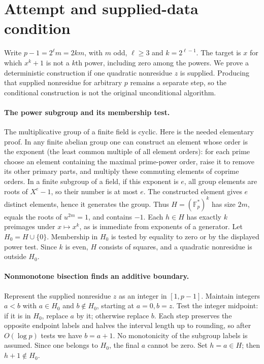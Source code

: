 \documentclass[11pt]{article}
\begin{document}
\section{Attempt and supplied-data condition}
Write $p-1=2^\ell m=2km$, with $m$ odd, $\ell\ge3$ and
$k=2^{\ell-1}$. The target is $x$ for which $x^k+1$ is not a
$k$th power, including zero among the powers. We prove a deterministic
construction if one quadratic nonresidue $z$ is supplied. Producing
that supplied nonresidue for arbitrary $p$ remains a separate step,
so the conditional construction is not the original unconditional
algorithm.

\paragraph{The power subgroup and its membership test.}
The multiplicative group of a finite field is cyclic. Here is the
needed elementary proof. In any finite abelian group one can construct
an element whose order is the exponent (the least common multiple of
all element orders): for each prime choose an element containing the
maximal prime-power order, raise it to remove its other primary parts,
and multiply these commuting elements of coprime orders. In a finite
subgroup of a field, if this exponent is $e$, all group elements are
roots of $X^e-1$, so their number is at most $e$. The constructed
element gives $e$ distinct elements, hence it generates the group.
Thus
$H=(\mathbb F_p^*)^k$ has size $2m$, equals the roots of
$u^{2m}=1$, and contains $-1$. Each $h\in H$ has exactly $k$
preimages under $x\mapsto x^k$, as is immediate from exponents of
a generator. Let $H_0=H\cup\{0\}$. Membership in $H_0$ is tested
by equality to zero or by the displayed power test. Since $k$ is even,
$H$ consists of squares, and a quadratic nonresidue is outside $H_0$.

\paragraph{Nonmonotone bisection finds an additive boundary.}
Represent the supplied nonresidue $z$ as an integer in $[1,p-1]$.
Maintain integers $a<b$ with $a\in H_0$ and $b\notin H_0$, starting
at $a=0,b=z$. Test the integer midpoint: if it is in $H_0$, replace
$a$ by it; otherwise replace $b$. Each step preserves the opposite
endpoint labels and halves the interval length up to rounding, so after
$O(\log p)$ tests we have $b=a+1$. No monotonicity of the subgroup
labels is assumed. Since one belongs to $H_0$, the final $a$ cannot
be zero. Set $h=a\in H$; then $h+1\notin H_0$.
\end{document}
